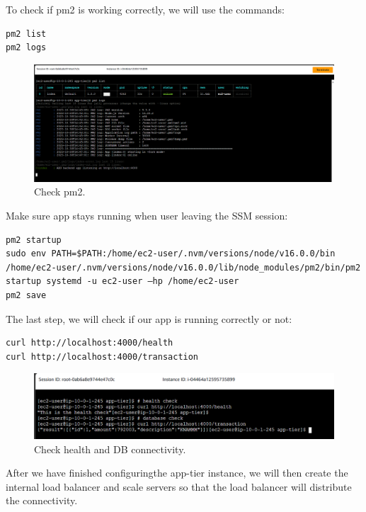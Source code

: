 \documentclass{article}
\begin{document}
To check if pm2 is working correctly, we will use the commands:\par
\begin{lstlisting}
pm2 list
pm2 logs
\end{lstlisting}

\begin{figure}[h]
    \centering
    \includegraphics[width=12cm]{Pictures/App-tier/Check_active.png}
    \caption{Check pm2.}
    \label{fig:enter-label}
\end{figure}

\newpage
Make sure app stays running when user leaving the SSM session:\par

\begin{lstlisting}
pm2 startup
sudo env PATH=$PATH:/home/ec2-user/.nvm/versions/node/v16.0.0/bin /home/ec2-user/.nvm/versions/node/v16.0.0/lib/node_modules/pm2/bin/pm2 startup systemd -u ec2-user —hp /home/ec2-user
pm2 save
\end{lstlisting}

The last step, we will check if our app is running correctly or not:\par
\begin{lstlisting}
curl http://localhost:4000/health
curl http://localhost:4000/transaction
\end{lstlisting}

\begin{figure}[h]
    \centering
    \includegraphics[width=12cm]{Pictures/App-tier/Check_health&DB.png}
    \caption{Check health and DB connectivity.}
    \label{fig:enter-label}
\end{figure}

After we have finished configuringthe app-tier instance, we will then create the internal load balancer and scale servers so that the load balancer will distribute the connectivity.\par
\newpage
\end{document}
